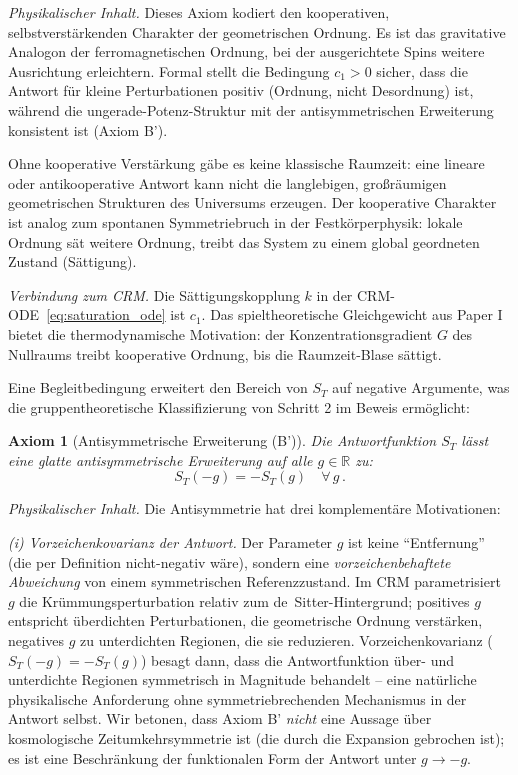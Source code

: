 \documentclass[aps,prd,twocolumn,superscriptaddress,nofootinbib]{revtex4-2}
\newtheorem{axiom}{Axiom}
\begin{document}
\textit{Physikalischer Inhalt.} Dieses Axiom kodiert den kooperativen, selbstverstärkenden Charakter der geometrischen Ordnung. Es ist das gravitative Analogon der ferromagnetischen Ordnung, bei der ausgerichtete Spins weitere Ausrichtung erleichtern. Formal stellt die Bedingung $c_1 > 0$ sicher, dass die Antwort für kleine Perturbationen positiv (Ordnung, nicht Desordnung) ist, während die ungerade-Potenz-Struktur mit der antisymmetrischen Erweiterung konsistent ist (Axiom B').

Ohne kooperative Verstärkung gäbe es keine klassische Raumzeit: eine lineare oder antikooperative Antwort kann nicht die langlebigen, großräumigen geometrischen Strukturen des Universums erzeugen. Der kooperative Charakter ist analog zum spontanen Symmetriebruch in der Festkörperphysik: lokale Ordnung sät weitere Ordnung, treibt das System zu einem global geordneten Zustand (Sättigung).

\textit{Verbindung zum CRM.} Die Sättigungskopplung $k$ in der CRM-ODE~\eqref{eq:saturation_ode} ist $c_1$. Das spieltheoretische Gleichgewicht aus Paper I \cite{Geiger2026} bietet die thermodynamische Motivation: der Konzentrationsgradient $G$ des Nullraums treibt kooperative Ordnung, bis die Raumzeit-Blase sättigt.

Eine Begleitbedingung erweitert den Bereich von $S_T$ auf negative Argumente, was die gruppentheoretische Klassifizierung von Schritt 2 im Beweis ermöglicht:

\begin{axiom}[Antisymmetrische Erweiterung (B')]
\label{ax:antisymmetry}
Die Antwortfunktion $S_T$ lässt eine glatte antisymmetrische Erweiterung auf alle $g \in \mathbb{R}$ zu:
\begin{equation}
S_T(-g) = -S_T(g) \quad \forall\, g\,.
\label{eq:antisymmetry}
\end{equation}
\end{axiom}

\textit{Physikalischer Inhalt.} Die Antisymmetrie hat drei komplementäre Motivationen:

\textit{(i) Vorzeichenkovarianz der Antwort.} Der Parameter $g$ ist keine ``Entfernung'' (die per Definition nicht-negativ wäre), sondern eine \textit{vorzeichenbehaftete Abweichung} von einem symmetrischen Referenzzustand. Im CRM parametrisiert $g$ die Krümmungsperturbation relativ zum de~Sitter-Hintergrund; positives $g$ entspricht überdichten Perturbationen, die geometrische Ordnung verstärken, negatives $g$ zu unterdichten Regionen, die sie reduzieren. Vorzeichenkovarianz ($S_T(-g) = -S_T(g)$) besagt dann, dass die Antwortfunktion über- und unterdichte Regionen symmetrisch in Magnitude behandelt -- eine natürliche physikalische Anforderung ohne symmetriebrechenden Mechanismus in der Antwort selbst. Wir betonen, dass Axiom B' \textit{nicht} eine Aussage über kosmologische Zeitumkehrsymmetrie ist (die durch die Expansion gebrochen ist); es ist eine Beschränkung der funktionalen Form der Antwort unter $g \to -g$.
\end{document}
